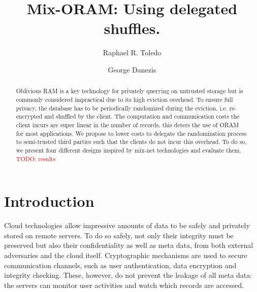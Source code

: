\documentclass[USenglish,oneside,twocolumn]{article}
\newcommand{\todo}[1]{\textcolor{red}{TODO: #1}}
\begin{document}
 
\author[1]{Raphael R. Toledo}

\author[2]{George Danezis}



  \title{Mix-ORAM: Using delegated shuffles.}

  \begin{abstract}
{
Oblivious RAM is a key technology for privately querying on untrusted storage but is commonly considered impractical due to its high eviction overhead. To ensure full privacy, the database has to be periodically randomized during the eviction, i.e. re-encrypted and shuffled by the client. The computation and communication costs the client incurs are super linear in the number of records, this deters the use of ORAM for most applications. We propose to lower costs to delegate the randomization process to semi-trusted third parties such that the clients do not incur this overhead. To do so, we present four different designs inspired by mix-net technologies and evaluate them. \todo{results}
}
\end{abstract}



\maketitle
%
\section{Introduction}\label{Introduction}
%

Cloud technologies allow impressive amounts of data to be safely and privately stored on remote servers. To do so safely, not only their integrity must be preserved but also their confidentiality as well as meta data, from both external adversaries and the cloud itself.
Cryptographic mechanisms are used to secure communication channels, such as user authentication, data encryption and integrity checking.
These, however, do not prevent the leakage of all meta data: the servers can monitor user activities and watch which records are accessed. \\
\end{document}
